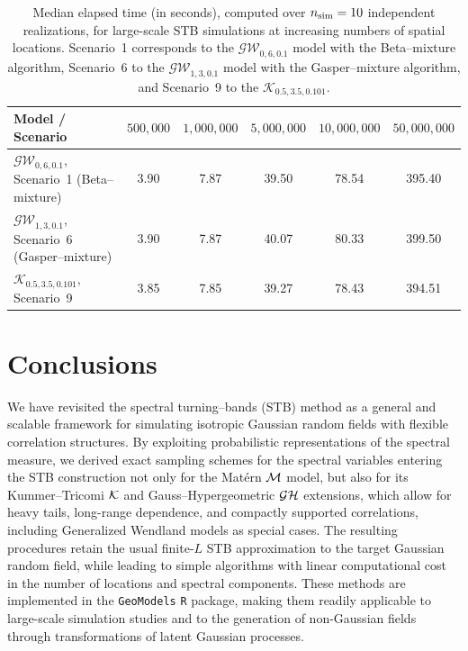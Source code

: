 \documentclass[
  12pt]{article}
\begin{document}
\begin{table}[htbp]
\centering
\caption{Median elapsed time (in seconds), computed over $n_{\rm sim}=10$ independent realizations, for large-scale STB simulations at increasing numbers of spatial locations. Scenario~1 corresponds to the $\mathcal{GW}_{0,6,0.1}$ model with the Beta--mixture algorithm, Scenario~6 to the $\mathcal{GW}_{1,3,0.1}$ model with the Gasper--mixture algorithm, and Scenario~9 to the $\mathcal{K}_{0.5,3.5,0.101}$.}
\label{tab:large-scale-times}
\begin{tabular}{lccccc}
\hline
Model / Scenario & $500{,}000$ & $1{,}000{,}000$ & $5{,}000{,}000$ & $10{,}000{,}000$ & $50{,}000{,}000$ \\
\hline
$\mathcal{GW}_{0,6,0.1}$, Scenario~1 (Beta--mixture) & 3.90 & 7.87 & 39.50 & 78.54 & 395.40 \\
$\mathcal{GW}_{1,3,0.1}$, Scenario~6 (Gasper--mixture) & 3.90 & 7.87 & 40.07 & 80.33 & 399.50 \\
$\mathcal{K}_{0.5,3.5,0.101}$, Scenario~9 & 3.85 & 7.85 & 39.27 & 78.43 &  394.51 \\
\hline
\end{tabular}
\end{table}







\section{Conclusions}
\label{sec8}

We have revisited the spectral turning--bands (STB) method as a general and scalable framework for simulating isotropic Gaussian random fields with flexible correlation structures. By exploiting probabilistic representations of the spectral measure, we derived exact sampling schemes for the spectral variables entering the STB construction not only for the Mat\'ern ${\cal M}$ model, but also for its Kummer--Tricomi ${\cal K}$ and Gauss--Hypergeometric ${\cal GH}$ extensions, which allow for heavy tails, long-range dependence, and compactly supported correlations, including Generalized Wendland models as special cases. The resulting procedures retain the usual finite-$L$ STB approximation to the target Gaussian random field, while leading to simple algorithms with linear computational cost in the number of locations and spectral components. These methods are implemented in the \texttt{GeoModels} \texttt{R} package, making them readily applicable to large-scale simulation studies and to the generation of non-Gaussian fields through transformations of latent Gaussian processes.
\end{document}
